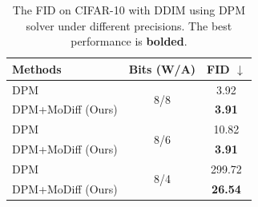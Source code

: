 \begin{table}[h!]
\centering
\caption{The FID on CIFAR-10 with DDIM using DPM solver under different precisions. The best performance is \textbf{bolded}.}
\begin{tabular}{l|c|c}
\toprule
{Methods} & {Bits (W/A)} & FID $\downarrow$ \\
\midrule
DPM & \multirow{2}{*}{8/8} & 3.92 \\
DPM+MoDiff (Ours) & & \bf 3.91  \\
\midrule
DPM & \multirow{2}{*}{8/6} & 10.82  \\
DPM+MoDiff (Ours) & & \bf 3.91  \\
\midrule
DPM & \multirow{2}{*}{8/4} & 299.72 \\
DPM+MoDiff (Ours) & & \bf 26.54 \\
\bottomrule
\end{tabular}
\label{tab:dpm}
\end{table}